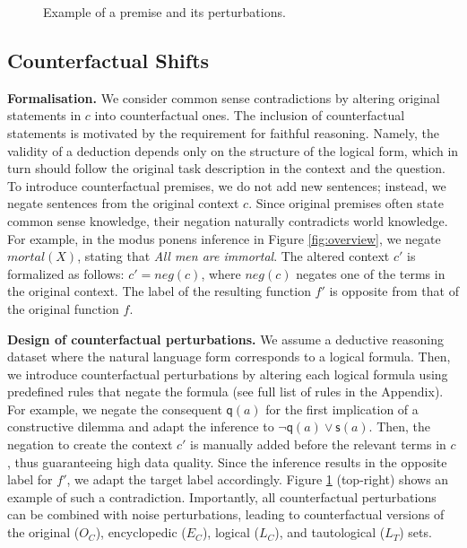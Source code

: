 \begin{figure}[!t]
    \caption{Example of a premise and its perturbations.}
    \label{fig:perturbation_example}
\end{figure}


\subsection{Counterfactual Shifts}


\textbf{Formalisation.}
We consider common sense contradictions by altering original statements in $c$ into counterfactual ones. The inclusion of counterfactual statements is motivated by the requirement for faithful reasoning. Namely, the validity of a deduction depends only on the structure of the logical form, which in turn should follow the original task description in the context and the question. To introduce counterfactual premises, we do not add new sentences; instead, we negate sentences from the original context $c$. Since original premises often state common sense knowledge, their negation naturally contradicts world knowledge. For example, in the modus ponens inference in Figure \ref{fig:overview}, we negate $mortal(X)$, stating that \emph{All men are immortal}. The altered context $c'$ is formalized as follows: $c'=neg(c)$, where $neg(c)$ negates one of the terms in the original context. The label of the resulting function $f'$ is opposite from that of the original function $f$.

\noindent \textbf{Design of counterfactual perturbations.} 
We assume a deductive reasoning dataset where the natural language form corresponds to a logical formula. Then, we introduce counterfactual perturbations by altering each logical formula using predefined rules that negate the formula (see full list of rules in the Appendix).
For example, we negate the consequent $\mathsf{q}(a)$ for the first implication of a constructive dilemma and adapt the inference to $\neg \mathsf{q}(a) \vee \mathsf{s}(a)$. 
Then, the negation to create the context $c'$ is manually added before the relevant terms in $c$, thus guaranteeing high data quality. 
Since the inference results in the opposite label for $f'$, we adapt the target label accordingly. Figure \ref{fig:perturbation_example} (top-right) shows an example of such a contradiction. Importantly, all counterfactual perturbations can be combined with noise perturbations, leading to counterfactual versions of the original ($O_C$), encyclopedic ($E_C$), logical ($L_C$), and tautological ($L_T$) sets.